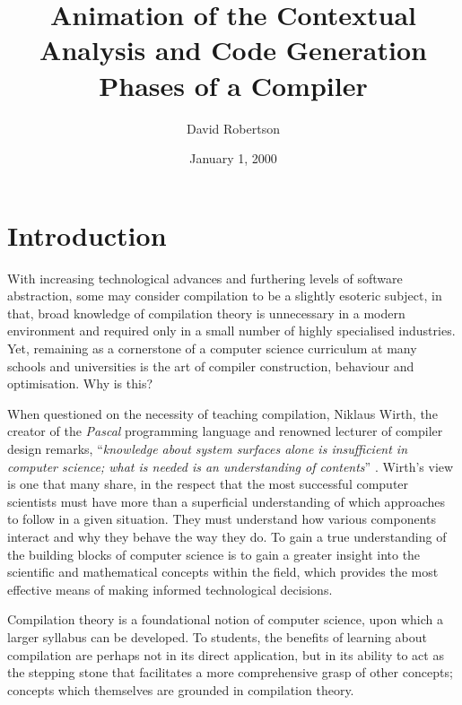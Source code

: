 \documentclass{l4proj}
\begin{document}
\title{Animation of the Contextual Analysis and Code Generation Phases of a Compiler}
\author{David Robertson}
\date{January 1, 2000}
\maketitle

\begin{abstract}

\end{abstract}

\educationalconsent
%
%
\tableofcontents

\chapter{Introduction}
With increasing technological advances and furthering levels of software abstraction, some may consider compilation to be a slightly esoteric subject, in that, broad knowledge of compilation theory is unnecessary in a modern environment and required only in a small number of highly specialised industries. Yet, remaining as a cornerstone of a computer science curriculum at many schools and universities is the art of compiler construction, behaviour and optimisation. Why is this?

When questioned on the necessity of teaching compilation, Niklaus Wirth, the creator of the \textit{Pascal} programming language and renowned lecturer of compiler design remarks, ``\textit{knowledge about system surfaces alone is insufficient in computer science; what is needed is an understanding of contents}'' \cite{WirthTheory}. Wirth's view is one that many share, in the respect that the most successful computer scientists must have more than a superficial understanding of which approaches to follow in a given situation. They must understand how various components interact and why they behave the way they do. To gain a true understanding of the building blocks of computer science is to gain a greater insight into the scientific and mathematical concepts within the field, which provides the most effective means of making informed technological decisions. 

Compilation theory is a foundational notion of computer science, upon which a larger syllabus can be developed. To students, the benefits of learning about compilation are perhaps not in its direct application, but in its ability to act as the stepping stone that facilitates a more comprehensive grasp of other concepts; concepts which themselves are grounded in compilation theory.  
\end{document}
